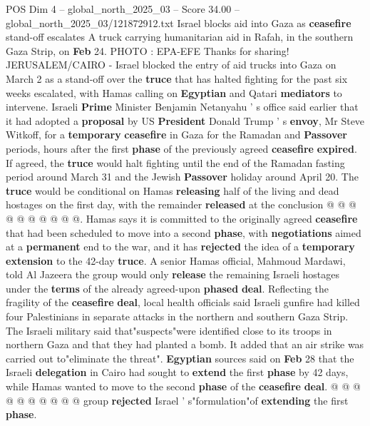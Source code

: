 \begin{textsample}{POS Dim 4 – global\_north\_2025\_03 – Score 34.00 – global\_north\_2025\_03/121872912.txt}  \label{ex:f4_pos_062}
Israel blocks aid into Gaza as \textbf{ceasefire} stand-off escalates A truck carrying humanitarian aid in Rafah, in the southern Gaza Strip, on \textbf{Feb} 24.
PHOTO : EPA-EFE Thanks for sharing!
JERUSALEM/CAIRO - Israel blocked the entry of aid trucks into Gaza on March 2 as a stand-off over the \textbf{truce} that has halted fighting for the past six weeks escalated, with Hamas calling on \textbf{Egyptian} and Qatari \textbf{mediators} to intervene.
Israeli \textbf{Prime} Minister Benjamin Netanyahu ' s office said earlier that it had adopted a \textbf{proposal} by US \textbf{President} Donald Trump ' s \textbf{envoy}, Mr Steve Witkoff, for a \textbf{temporary} \textbf{ceasefire} in Gaza for the Ramadan and \textbf{Passover} periods, hours after the first \textbf{phase} of the previously agreed \textbf{ceasefire} \textbf{expired}.
If agreed, the \textbf{truce} would halt fighting until the end of the Ramadan fasting period around March 31 and the Jewish \textbf{Passover} holiday around April 20.
The \textbf{truce} would be conditional on Hamas \textbf{releasing} half of the living and dead hostages on the first day, with the remainder \textbf{released} at the conclusion @ @ @ @ @ @ @ @ @ @.
Hamas says it is committed to the originally agreed \textbf{ceasefire} that had been scheduled to move into a second \textbf{phase}, with \textbf{negotiations} aimed at a \textbf{permanent} end to the war, and it has \textbf{rejected} the idea of a \textbf{temporary} \textbf{extension} to the 42-day \textbf{truce}.
A senior Hamas official, Mahmoud Mardawi, told Al Jazeera the group would only \textbf{release} the remaining Israeli hostages under the \textbf{terms} of the already agreed-upon \textbf{phased} \textbf{deal}.
Reflecting the fragility of the \textbf{ceasefire} \textbf{deal}, local health officials said Israeli gunfire had killed four Palestinians in separate attacks in the northern and southern Gaza Strip.
The Israeli military said that"suspects"were identified close to its troops in northern Gaza and that they had planted a bomb.
It added that an air strike was carried out to"eliminate the threat". \textbf{Egyptian} sources said on \textbf{Feb} 28 that the Israeli \textbf{delegation} in Cairo had sought to \textbf{extend} the first \textbf{phase} by 42 days, while Hamas wanted to move to the second \textbf{phase} of the \textbf{ceasefire} \textbf{deal}. @ @ @ @ @ @ @ @ @ @ group \textbf{rejected} Israel ' s"formulation"of \textbf{extending} the first \textbf{phase}.

\end{textsample}
